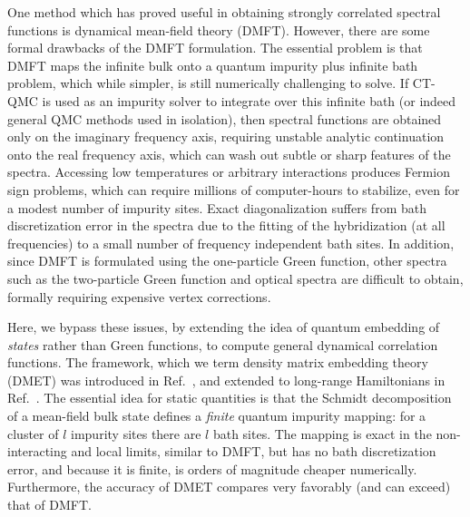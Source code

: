 \documentclass[aps,twocolumn,nobibnotes]{revtex4}
\begin{document}
One method which has proved useful in obtaining strongly correlated spectral functions is dynamical mean-field 
theory (DMFT)\cite{Georges1992,Georges1996,Kotliar2006}. 
However, there are some formal drawbacks of the DMFT formulation. 
The essential problem is that DMFT maps the infinite bulk onto a quantum impurity plus infinite bath problem, which while 
simpler, is still numerically challenging to solve.
If CT-QMC is used as an 
impurity solver to integrate over this infinite bath (or indeed general QMC methods used in isolation), then spectral 
functions are obtained only on the imaginary frequency 
axis, requiring unstable analytic continuation onto the real frequency axis, which can wash out subtle or sharp features of the 
spectra\cite{Millis2006,Millis2009}. Accessing low temperatures or arbitrary interactions produces Fermion sign problems, which can require millions
of computer-hours to stabilize, even for a modest number of impurity sites.
Exact diagonalization suffers from bath discretization error in the spectra due to the 
fitting of the hybridization (at all frequencies) to a small number of frequency independent bath sites\cite{Liebsch2012}. 
In addition, since DMFT is formulated using the one-particle Green function, other spectra such as the two-particle Green function and optical spectra are 
difficult to obtain, formally requiring expensive vertex corrections\cite{Millis2012}. 

Here, we bypass these issues, by extending the idea of quantum embedding of {\em states} rather than Green functions, to compute general dynamical
correlation functions. The framework, which we term density matrix embedding theory (DMET) was introduced in 
Ref.~, and extended to long-range Hamiltonians in Ref.~. 
The essential idea for static quantities is that the Schmidt decomposition of a mean-field bulk state defines a {\em finite} quantum impurity mapping:
for a cluster of $l$ impurity sites there are $l$ bath sites. The mapping is exact in the non-interacting and local limits, similar to DMFT, but
has no bath discretization error, and because it is finite, is orders of magnitude cheaper numerically. Furthermore, the accuracy of DMET compares
very favorably (and can exceed) that of DMFT.
\end{document}
